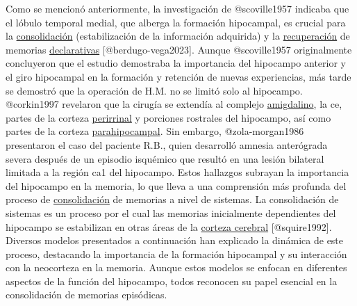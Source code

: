 \documentclass[
  11pt]{../MastersDoctoralThesisUNAM}
\begin{document}
Como se mencionó anteriormente, la investigación de @scoville1957
indicaba que el lóbulo temporal medial, que alberga la formación
hipocampal, es crucial para la
\href{AppendixB.qmd\#term-id-10}{consolidación} (estabilización de la
información adquirida) y la
\href{AppendixB.qmd\#term-id-12}{recuperación} de memorias
\href{AppendixB.qmd\#term-id-6}{declarativas} {[}@berdugo-vega2023{]}.
Aunque @scoville1957 originalmente concluyeron que el estudio demostraba
la importancia del hipocampo anterior y el giro hipocampal en la
formación y retención de nuevas experiencias, más tarde se demostró que
la operación de H.M. no se limitó solo al hipocampo. @corkin1997
revelaron que la cirugía se extendía al complejo
\href{AppendixB.qmd\#term-id-13}{amigdalino}, la \ac{ce}, partes de la
corteza \href{AppendixB.qmd\#term-id-66}{perirrinal} y porciones
rostrales del hipocampo, así como partes de la corteza
\href{AppendixB.qmd\#term-id-66}{parahipocampal}. Sin embargo,
@zola-morgan1986 presentaron el caso del paciente R.B., quien desarrolló
amnesia anterógrada severa después de un episodio isquémico que resultó
en una lesión bilateral limitada a la región \ac{ca}1 del hipocampo.
Estos hallazgos subrayan la importancia del hipocampo en la memoria, lo
que lleva a una comprensión más profunda del proceso de
\href{AppendixB.qmd\#term-id-10}{consolidación} de memorias a nivel de
sistemas. La consolidación de sistemas es un proceso por el cual las
memorias inicialmente dependientes del hipocampo se estabilizan en otras
áreas de la \href{AppendixB.qmd\#term-id-68}{corteza cerebral}
{[}@squire1992{]}. Diversos modelos presentados a continuación han
explicado la dinámica de este proceso, destacando la importancia de la
formación hipocampal y su interacción con la neocorteza en la memoria.
Aunque estos modelos se enfocan en diferentes aspectos de la función del
hipocampo, todos reconocen su papel esencial en la consolidación de
memorias episódicas.
\end{document}
